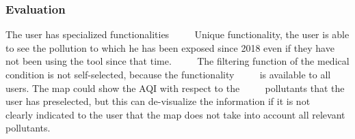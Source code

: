 \subsubsection*{Evaluation}

\begin{itemize}
  \done The user has specialized functionalities
     \done Unique functionality, the user is able to see the pollution to which he has been exposed since 2018 even if they have not been using the tool since that time.
     \crossed The filtering function of the medical condition is not self-selected, because the functionality
     is available to all users. The map could show the AQI with respect to the
     pollutants that the user has preselected, but this can de-visualize the information if it is not
     clearly indicated to the user that the map does not take into account all relevant pollutants.
\end{itemize}
